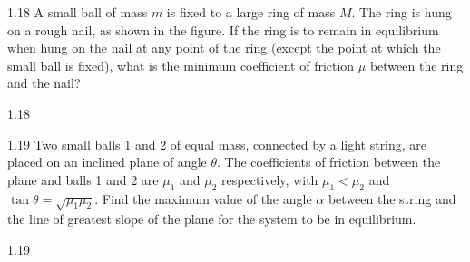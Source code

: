 \begin{problem}{1.18}
A small ball of mass $m$ is fixed to a large ring of mass $M$. The ring is hung on a rough nail, as shown in the figure. If the ring is to remain in equilibrium when hung on the nail at any point of the ring (except the point at which the small ball is fixed), what is the minimum coefficient of friction $\mu$ between the ring and the nail?
\end{problem}

\begin{figbox}{1.18}
\end{figbox}

\begin{problem}{1.19}
Two small balls 1 and 2 of equal mass, connected by a light string, are placed on an inclined plane of angle $\theta$. The coefficients of friction between the plane and balls 1 and 2 are $\mu_1$ and $\mu_2$ respectively, with $\mu_1<\mu_2$ and $\tan\theta=\sqrt{\mu_1\mu_2}$. Find the maximum value of the angle $\alpha$ between the string and the line of greatest slope of the plane for the system to be in equilibrium.
\end{problem}

\begin{figbox}{1.19}
\end{figbox}

